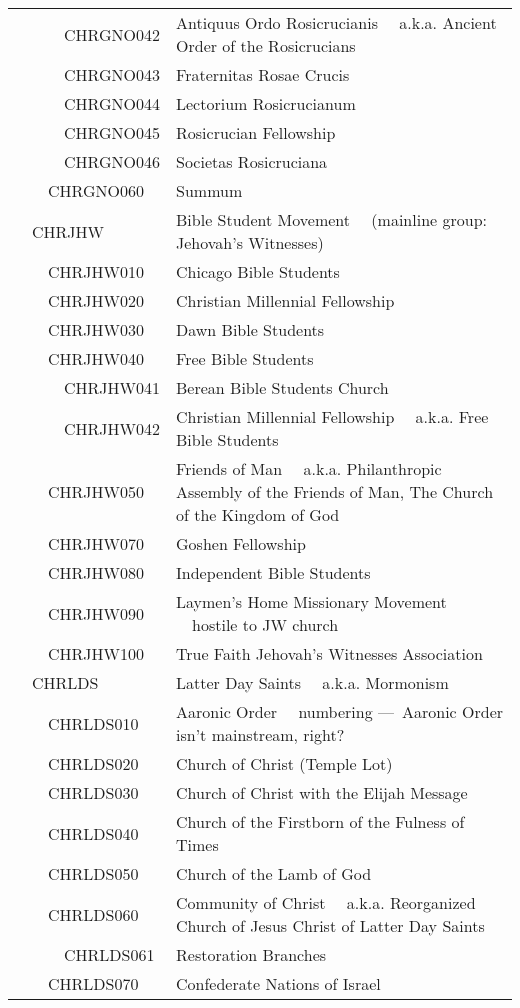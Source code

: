\documentclass[12pt]{article}
\begin{document}
\begin{tiny}
\begin{center}
\begin{longtable}{|l|l|}
~~~~~~CHRGNO042 & Antiquus Ordo Rosicrucianis	~~a.k.a. Ancient Order of the Rosicrucians \\
~~~~~~CHRGNO043 & Fraternitas Rosae Crucis \\
~~~~~~CHRGNO044 & Lectorium Rosicrucianum \\
~~~~~~CHRGNO045 & Rosicrucian Fellowship \\
~~~~~~CHRGNO046 & Societas Rosicruciana \\
~~~~CHRGNO060 & Summum \\
~~CHRJHW & Bible Student Movement	~~(mainline group: Jehovah's Witnesses) \\
~~~~CHRJHW010 & Chicago Bible Students \\
~~~~CHRJHW020 & Christian Millennial Fellowship \\
~~~~CHRJHW030 & Dawn Bible Students \\
~~~~CHRJHW040 & Free Bible Students \\
~~~~~~CHRJHW041 & Berean Bible Students Church \\
~~~~~~CHRJHW042 & Christian Millennial Fellowship	~~a.k.a. Free Bible Students \\
~~~~CHRJHW050 & Friends of Man	~~a.k.a. Philanthropic Assembly of the Friends of Man, The Church of the Kingdom of God \\
~~~~CHRJHW070 & Goshen Fellowship \\
~~~~CHRJHW080 & Independent Bible Students \\
~~~~CHRJHW090 & Laymen's Home Missionary Movement	~~hostile to JW church \\
~~~~CHRJHW100 & True Faith Jehovah's Witnesses Association \\
~~CHRLDS & Latter Day Saints	~~a.k.a. Mormonism \\
~~~~CHRLDS010 & Aaronic Order	~~numbering — Aaronic Order isn't mainstream, right? \\
~~~~CHRLDS020 & Church of Christ (Temple Lot) \\
~~~~CHRLDS030 & Church of Christ with the Elijah Message \\
~~~~CHRLDS040 & Church of the Firstborn of the Fulness of Times \\
~~~~CHRLDS050 & Church of the Lamb of God \\
~~~~CHRLDS060 & Community of Christ	~~a.k.a. Reorganized Church of Jesus Christ of Latter Day Saints \\
~~~~~~CHRLDS061 & Restoration Branches \\
~~~~CHRLDS070 & Confederate Nations of Israel \\

\end{longtable}
\end{center}
\end{tiny}
\end{document}
